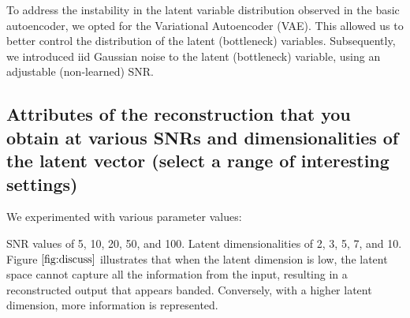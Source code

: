 \documentclass{article}
\begin{document}
To address the instability in the latent variable distribution observed in the basic autoencoder, we opted for the Variational Autoencoder (VAE). This allowed us to better control the distribution of the latent (bottleneck) variables. Subsequently, we introduced iid Gaussian noise to the latent (bottleneck) variable, using an adjustable (non-learned) SNR.
\subsection{Attributes of the reconstruction that you obtain at various SNRs and dimensionalities of the latent vector (select a range of interesting settings)}
\label{ssec:discuss}

We experimented with various parameter values:

SNR values of 5, 10, 20, 50, and 100.
Latent dimensionalities of 2, 3, 5, 7, and 10.
Figure $\ref{fig:discuss}$ illustrates that when the latent dimension is low, the latent space cannot capture all the information from the input, resulting in a reconstructed output that appears banded. Conversely, with a higher latent dimension, more information is represented.
\end{document}
